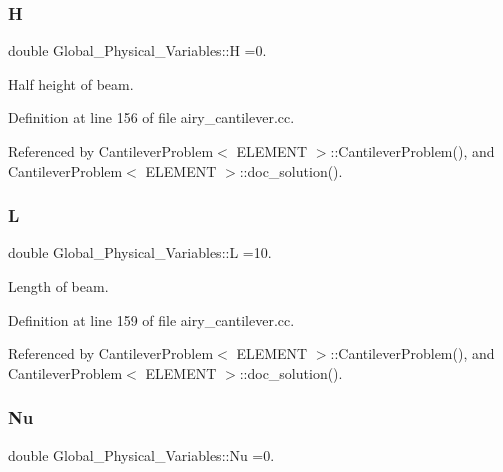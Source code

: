 \subsubsection{\texorpdfstring{H}{H}}
{\footnotesize\ttfamily double Global\+\_\+\+Physical\+\_\+\+Variables\+::H =0.}



Half height of beam. 



Definition at line 156 of file airy\+\_\+cantilever.\+cc.



Referenced by Cantilever\+Problem$<$ E\+L\+E\+M\+E\+N\+T $>$\+::\+Cantilever\+Problem(), and Cantilever\+Problem$<$ E\+L\+E\+M\+E\+N\+T $>$\+::doc\+\_\+solution().

\mbox{\label{namespaceGlobal__Physical__Variables_a1b8bfc451f6b7ac89eca18f04338f47f}} 
\subsubsection{\texorpdfstring{L}{L}}
{\footnotesize\ttfamily double Global\+\_\+\+Physical\+\_\+\+Variables\+::L =10.}



Length of beam. 



Definition at line 159 of file airy\+\_\+cantilever.\+cc.



Referenced by Cantilever\+Problem$<$ E\+L\+E\+M\+E\+N\+T $>$\+::\+Cantilever\+Problem(), and Cantilever\+Problem$<$ E\+L\+E\+M\+E\+N\+T $>$\+::doc\+\_\+solution().

\mbox{\label{namespaceGlobal__Physical__Variables_a3962c36313826b19f216f6bbbdd6a477}} 
\subsubsection{\texorpdfstring{Nu}{Nu}}
{\footnotesize\ttfamily double Global\+\_\+\+Physical\+\_\+\+Variables\+::\+Nu =0.}



